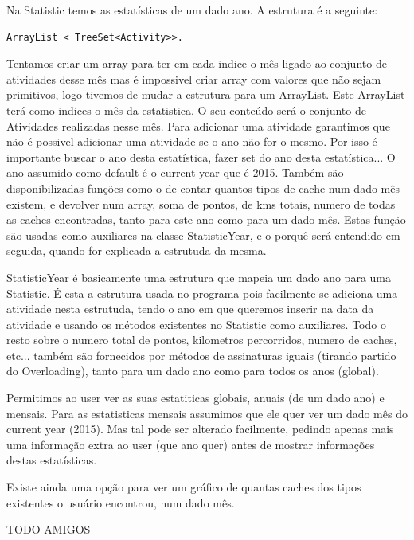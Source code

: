 \documentclass{article}
\begin{document}
\par Na Statistic temos as estatísticas de um dado ano. A estrutura é a seguinte:
\begin{lstlisting} 
ArrayList < TreeSet<Activity>>. 
\end{lstlisting}

Tentamos criar um array para ter em cada indice o mês ligado ao conjunto de atividades desse mês mas é impossivel criar array com valores que não sejam primitivos, logo tivemos de mudar a estrutura para um ArrayList. Este ArrayList terá como indices o mês da estatistica. O seu conteúdo será o conjunto de Atividades realizadas nesse mês. Para adicionar uma atividade garantimos que não é possivel adicionar uma atividade se o ano não for o mesmo. Por isso é importante buscar o ano desta estatística, fazer set do ano desta estatística... O ano assumido como default é o current year que é 2015. Também são disponibilizadas funções como o de contar quantos tipos de cache num dado mês existem, e devolver num array, soma de pontos, de kms totais, numero de todas as caches encontradas, tanto para este ano como para um dado mês. Estas função são usadas como auxiliares na classe StatisticYear, e o porquê será entendido em seguida, quando for explicada a estrutuda da mesma.
\par StatisticYear é basicamente uma estrutura que mapeia um dado ano para uma Statistic. É esta a estrutura usada no programa pois facilmente se adiciona uma atividade nesta estrutuda, tendo o ano em que queremos inserir na data da atividade e usando os métodos existentes no Statistic como auxiliares. Todo o resto sobre o numero total de pontos, kilometros percorridos, numero de caches, etc... também são fornecidos por métodos de assinaturas iguais (tirando partido do Overloading), tanto para um dado ano como para todos os anos (global).


\par Permitimos ao user ver as suas estatiticas globais, anuais (de um dado ano) e mensais. Para as estatisticas mensais assumimos que ele quer ver um dado mês do current year (2015). Mas tal pode ser alterado facilmente, pedindo apenas mais uma informação extra ao user (que ano quer) antes de mostrar informações destas estatísticas.

\par Existe ainda uma opção para ver um gráfico de quantas caches dos tipos existentes o usuário encontrou, num dado mês.




\pagebreak
TODO AMIGOS
\end{document}
